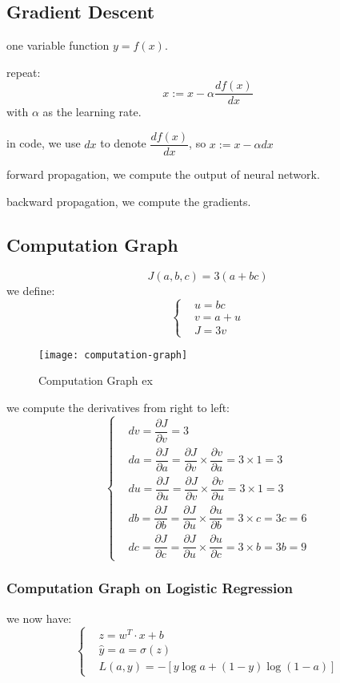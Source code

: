 \subsection{Gradient Descent}
one variable function $y = f(x)$.

repeat: $$x := x - \alpha \dfrac{df(x)}{dx}$$ with $\alpha$ as the learning rate.

in code, we use $dx$ to denote $\dfrac{df(x)}{dx}$, so $x := x - \alpha dx$

forward propagation, we compute the output of neural network.

backward propagation, we compute the gradients.

\subsection{Computation Graph}
$$J(a, b, c) = 3(a + bc)$$
we define:
$$
\left\{
\begin{aligned}
& u = bc \\
& v = a + u \\
& J = 3v
\end{aligned}
\right.
$$

\immediate{}
\begin{figure}[htbp]
	\centering
	\texttt{[image: computation-graph]}\\
	\caption{Computation Graph ex}\label{fig.computation-graph}
\end{figure}

we compute the derivatives from right to left:
$$
\left\{
\begin{aligned}
& dv = \dfrac{\partial J}{\partial v} = 3 \\
& da = \dfrac{\partial J}{\partial a} = \dfrac{\partial J}{\partial v} \times \dfrac{\partial v}{\partial a} = 3 \times 1 = 3 \\
& du = \dfrac{\partial J}{\partial u} = \dfrac{\partial J}{\partial v} \times \dfrac{\partial v}{\partial u} = 3 \times 1 = 3 \\
& db = \dfrac{\partial J}{\partial b} = \dfrac{\partial J}{\partial u} \times \dfrac{\partial u}{\partial b}= 3 \times c = 3c = 6 \\
& dc = \dfrac{\partial J}{\partial c} = \dfrac{\partial J}{\partial u} \times \dfrac{\partial u}{\partial c}= 3 \times b = 3b = 9
\end{aligned}
\right.
$$

\subsubsection{Computation Graph on Logistic Regression}
we now have:
$$
\left\{
\begin{aligned}
& z = w^T \cdot x + b \\
& \hat{y} = a = \sigma(z) \\
& L(a, y) = - [y \log a + (1 - y) \log (1 - a)]
\end{aligned}
\right.
$$

